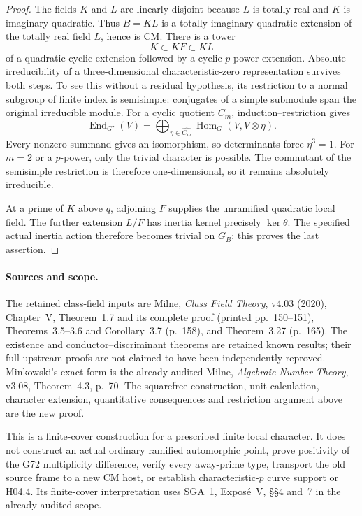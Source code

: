 \begin{proof}
The fields $K$ and $L$ are linearly disjoint because
$L$ is totally real and $K$ is imaginary quadratic.
Thus $B=KL$ is a totally imaginary quadratic extension
of the totally real field $L$, hence is CM.
There is a tower
\[
                   K\subset KF\subset KL
\]
of a quadratic cyclic extension followed by a cyclic
$p$-power extension. Absolute irreducibility of a
three-dimensional characteristic-zero representation
survives both steps. To see this without a residual
hypothesis, its restriction to a normal subgroup of
finite index is semisimple: conjugates of a simple
submodule span the original irreducible module.
For a cyclic quotient $C_m$, induction--restriction gives
\[
 \operatorname{End}_{G'}(V)
  =\bigoplus_{\eta\in\widehat{C_m}}
                    \operatorname{Hom}_{G}(V,V\otimes\eta).
                                                        \tag{G73.10}
\]
Every nonzero summand gives an isomorphism, so determinants
force $\eta^3=1$. For $m=2$ or a $p$-power, only the
trivial character is possible. The commutant of the
semisimple restriction is therefore one-dimensional,
so it remains absolutely irreducible.

At a prime of $K$ above $q$, adjoining $F$ supplies the
unramified quadratic local field. The further extension
$L/F$ has inertia kernel precisely $\ker\theta$.
The specified actual inertia action therefore becomes
trivial on $G_B$; this proves the last assertion.
\end{proof}

\paragraph{Sources and scope.}
The retained class-field inputs are Milne,
\emph{Class Field Theory}, v4.03 (2020), Chapter~V,
Theorem~1.7 and its complete proof (printed pp.~150--151),
Theorems~3.5--3.6 and Corollary~3.7 (p.~158), and
Theorem~3.27 (p.~165). The existence and conductor--discriminant
theorems are retained known results; their full upstream
proofs are not claimed to have been independently reproved.
Minkowski's exact form is the already audited Milne,
\emph{Algebraic Number Theory}, v3.08, Theorem~4.3, p.~70.
The squarefree construction, unit calculation, character
extension, quantitative consequences and restriction
argument above are the new proof.

This is a finite-cover construction for a prescribed
finite local character. It does not construct an actual
ordinary ramified automorphic point, prove positivity of
the G72 multiplicity difference, verify every away-prime
type, transport the old source frame to a new CM host,
or establish characteristic-$p$ curve support or H04.4.
Its finite-cover interpretation uses SGA~1, Expos\'e~V,
\S\S4 and~7 in the already audited scope.
